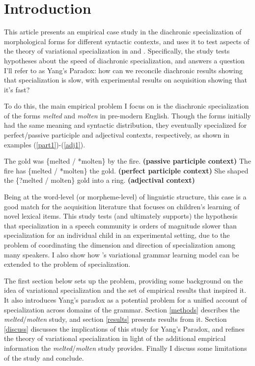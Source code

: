 \documentclass{artikel3}
\begin{document}
\section{Introduction}
\label{intro}

This article presents an empirical case study in the diachronic specialization of morphological forms for different syntactic contexts, and uses it to test aspects of the theory of variational specialization in \citet{wallenberg2016} and \citet{fruehwaldwallenberginprep}. Specifically, the study tests hypotheses about the speed of diachronic specialization, and answers a question I'll refer to as Yang's Paradox: how can we reconcile diachronic results showing that specialization is slow, with experimental results on acquisition showing that it's fast?

To do this, the main empirical problem I focus on is the diachronic specialization of the forms \textsl{melted} and \textsl{molten} in pre-modern English. Though the forms initially had the same meaning and syntactic distribution, they eventually specialized for perfect/passive participle and adjectival contexts, respectively, as shown in examples (\ref{part1})-(\ref{adj1}).

\begin{exe}
	\ex \label{part1} The gold was \{melted / *molten\} by the fire. \textbf{(passive participle context)}
	\ex \label{part2} The fire has \{melted / *molten\} the gold. \textbf{(perfect participle context)}
	\ex \label{adj1} She shaped the \{?melted / molten\} gold into a ring. \textbf{(adjectival context)}
\end{exe}

\noindent Being at the word-level (or morpheme-level) of linguistic structure, this case is a good match for the acquisition literature that focuses on children's learning of novel lexical items. This study tests (and ultimately supports) the hypothesis that specialization in a speech community is orders of magnitude slower than specialization for an individual child in an experimental setting, due to the problem of coordinating the dimension and direction of specialization among many speakers. I also show how \citet{yang2000}'s variational grammar learning model can be extended to the problem of specialization.

The first section below sets up the problem, providing some background on the idea of variational specialization and the set of empirical results that inspired it. It also introduces Yang's paradox as a potential problem for a unified account of specialization across domains of the grammar. Section \ref{methods} describes the \textsl{melted}/\textsl{molten} study, and section \ref{results} presents results from it. Section \ref{discuss} discusses the implications of this study for Yang's Paradox, and refines the theory of variational specialization in light of the additional empirical information the \textsl{melted}/\textsl{molten} study provides. Finally I discuss some limitations of the study and conclude.
\end{document}
